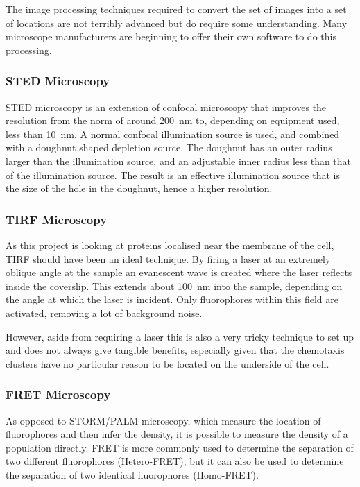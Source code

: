 \documentclass[../main.tex]{subfiles}
\begin{document}
The image processing techniques required to convert the set of images into a set of locations are not terribly advanced but do require some understanding. Many microscope manufacturers are beginning to offer their own software to do this processing.

\subsubsection{STED Microscopy}

STED microscopy is an extension of confocal microscopy that improves the resolution from the norm of around \SI{200}{\nano\meter} to, depending on equipment used, less than \SI{10}{\nano\meter}\cite{rittweger09}. A normal confocal illumination source is used, and combined with a doughnut shaped depletion source. The doughnut has an outer radius larger than the illumination source, and an adjustable inner radius less than that of the illumination source. The result is an effective illumination source that is the size of the hole in the doughnut, hence a higher resolution.

\subsubsection{TIRF Microscopy}
As this project is looking at proteins localised near the membrane of the cell, TIRF should have been an ideal technique. By firing a laser at an extremely oblique angle at the sample an evanescent wave is created where the laser reflects inside the coverslip. This extends about \SI{100}{\nano\meter} into the sample, depending on the angle at which the laser is incident. Only fluorophores within this field are activated, removing a lot of background noise.

However, aside from requiring a laser this is also a very tricky technique to set up and does not always give tangible benefits, especially given that the chemotaxis clusters have no particular reason to be located on the underside of the cell.

\subsubsection{FRET Microscopy}
As opposed to STORM/PALM microscopy, which measure the location of fluorophores and then infer the density, it is possible to measure the density of a population directly. FRET is more commonly used to determine the separation of two different fluorophores (Hetero-FRET), but it can also be used to determine the separation of two identical fluorophores (Homo-FRET).
\end{document}
